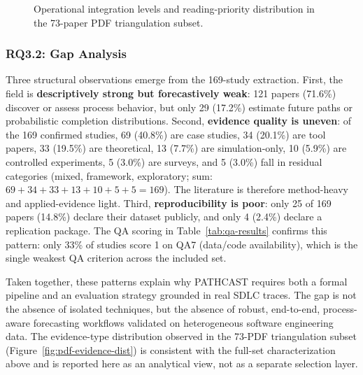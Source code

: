 \begin{figure}[p]
\centering
{}
\caption{Operational integration levels and reading-priority distribution in the 73-paper PDF triangulation subset.}
\label{fig:pdf-integration-priority}
\end{figure}

\subsubsection{RQ3.2: Gap Analysis}

Three structural observations emerge from the 169-study extraction. First,
the field is \textbf{descriptively strong but forecastively weak}: 121
papers (71.6\%) discover or assess process behavior, but only 29 (17.2\%)
estimate future paths or probabilistic completion distributions. Second,
\textbf{evidence quality is uneven}: of the 169 confirmed studies, 69
(40.8\%) are case studies, 34 (20.1\%) are tool papers, 33 (19.5\%) are
theoretical, 13 (7.7\%) are simulation-only, 10 (5.9\%) are controlled
experiments, 5 (3.0\%) are surveys, and 5 (3.0\%) fall in residual
categories (mixed, framework, exploratory; sum: $69+34+33+13+10+5+5 = 169$).
The literature is therefore method-heavy and applied-evidence light. Third, \textbf{reproducibility is poor}: only 25 of 169 papers
(14.8\%) declare their dataset publicly, and only 4 (2.4\%) declare a
replication package. The QA scoring in Table~\ref{tab:qa-results} confirms
this pattern: only 33\% of studies score 1 on QA7 (data/code availability),
which is the single weakest QA criterion across the included set.

Taken together, these patterns explain why PATHCAST requires both a formal
pipeline and an evaluation strategy grounded in real SDLC traces. The gap is
not the absence of isolated techniques, but the absence of robust,
end-to-end, process-aware forecasting workflows validated on heterogeneous
software engineering data. The evidence-type distribution observed in the
73-PDF triangulation subset (Figure~\ref{fig:pdf-evidence-dist}) is
consistent with the full-set characterization above and is reported here as
an analytical view, not as a separate selection layer.

